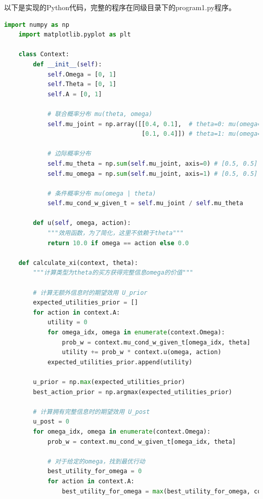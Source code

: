 以下是实现的Python代码，完整的程序在同级目录下的program1.py程序。

\begin{lstlisting}[language=Python,style=pythonstyle]
    import numpy as np
    import matplotlib.pyplot as plt
    
    class Context:
        def __init__(self):
            self.Omega = [0, 1]
            self.Theta = [0, 1]
            self.A = [0, 1]
            
            # 联合概率分布 mu(theta, omega)
            self.mu_joint = np.array([[0.4, 0.1],  # theta=0: mu(omega=0|theta=0)=0.4, mu(omega=1|theta=0)=0.1
                                      [0.1, 0.4]]) # theta=1: mu(omega=0|theta=1)=0.1, mu(omega=1|theta=1)=0.4
            
            # 边际概率分布
            self.mu_theta = np.sum(self.mu_joint, axis=0) # [0.5, 0.5]
            self.mu_omega = np.sum(self.mu_joint, axis=1) # [0.5, 0.5]
            
            # 条件概率分布 mu(omega | theta)
            self.mu_cond_w_given_t = self.mu_joint / self.mu_theta
            
        def u(self, omega, action):
            """效用函数，为了简化，这里不依赖于theta"""
            return 10.0 if omega == action else 0.0
    
    def calculate_xi(context, theta):
        """计算类型为theta的买方获得完整信息omega的价值"""
        
        # 计算无额外信息时的期望效用 U_prior
        expected_utilities_prior = []
        for action in context.A:
            utility = 0
            for omega_idx, omega in enumerate(context.Omega):
                prob_w = context.mu_cond_w_given_t[omega_idx, theta]
                utility += prob_w * context.u(omega, action)
            expected_utilities_prior.append(utility)
        
        u_prior = np.max(expected_utilities_prior)
        best_action_prior = np.argmax(expected_utilities_prior)
    
        # 计算拥有完整信息时的期望效用 U_post
        u_post = 0
        for omega_idx, omega in enumerate(context.Omega):
            prob_w = context.mu_cond_w_given_t[omega_idx, theta]
            
            # 对于给定的omega，找到最优行动
            best_utility_for_omega = 0
            for action in context.A:
                best_utility_for_omega = max(best_utility_for_omega, context.u(omega, action))
            

\end{lstlisting}
